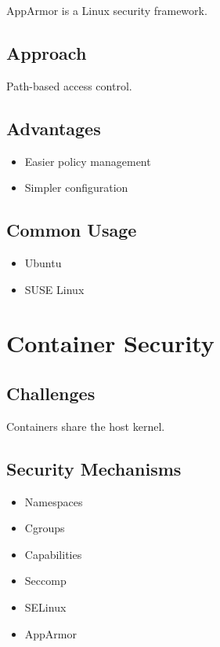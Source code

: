 AppArmor is a Linux security framework.

\subsection{Approach}

Path-based access control.

\subsection{Advantages}

\begin{itemize}
\item Easier policy management
\item Simpler configuration
\end{itemize}

\subsection{Common Usage}

\begin{itemize}
\item Ubuntu
\item SUSE Linux
\end{itemize}

\section{Container Security}

\subsection{Challenges}

Containers share the host kernel.

\subsection{Security Mechanisms}

\begin{itemize}
\item Namespaces
\item Cgroups
\item Capabilities
\item Seccomp
\item SELinux
\item AppArmor
\end{itemize}

